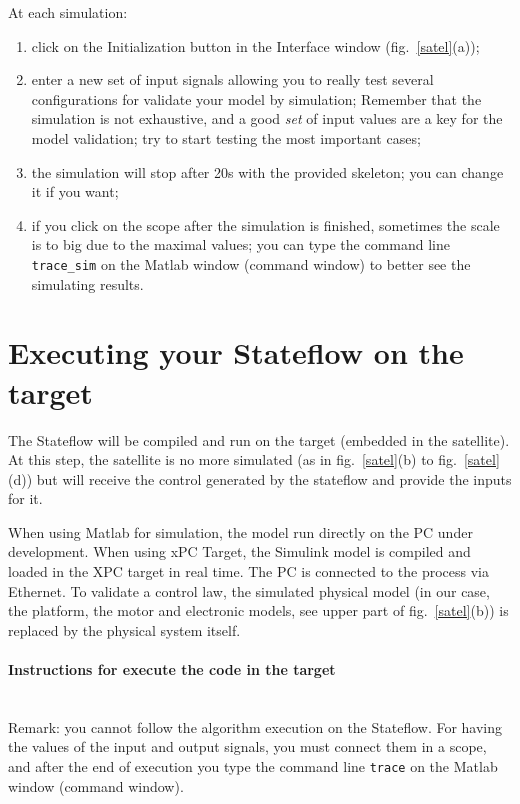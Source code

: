 \documentclass[a4paper]{article}
\begin{document}
At each simulation:
\begin{enumerate}
\item click on the Initialization button in the Interface window (fig.~\ref{satel}(a));
\item enter a new set of input signals allowing you to really test several configurations for
	validate your model by simulation; Remember that the simulation is not exhaustive, and a good
	{\it set} of input values are a key for the model validation; try to start testing the most
	important cases;
\item the simulation will stop after 20s with the provided skeleton; you can change it if you want;
\item if you click on the scope after the simulation is finished, sometimes the scale is to big
	due to the maximal values; you can type the command line {\tt trace\_sim} on the Matlab window
	(command window) to better see the simulating results.
\end{enumerate}

\section{Executing your Stateflow on the target}

The Stateflow will be compiled and run on the target (embedded in the satellite).
At this step, the satellite is no more simulated (as in  fig.~\ref{satel}(b) to 
fig.~\ref{satel}(d)) but will receive the control generated by the stateflow and provide the 
inputs for it.%

When using Matlab for simulation, the model run directly on the PC under development.
When using xPC Target, the Simulink model is compiled and loaded in the XPC target in real time. 
The PC is connected to the process via Ethernet. To validate a control law, the simulated physical
model (in our case, the platform, the motor and electronic models, see upper part of
fig.~\ref{satel}(b)) is replaced by the physical system itself.%

\paragraph{Instructions for execute the code in the target}~\\
Remark: you cannot follow the algorithm execution on the Stateflow. For having the values of the
input and output signals, you must connect them in a scope, and after the end of execution you type
the command line {\tt trace} on the Matlab window (command window).\\
\end{document}
